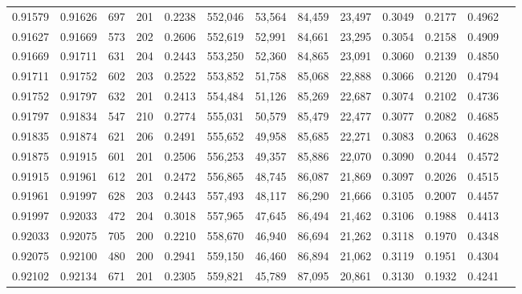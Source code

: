 \begin{tabular}{rrrrrrrrrrrrr}
0.91579 & 0.91626 &   697 & 201 &                                     0.2238 & 552,046 &  53,564 &  84,459 &  23,497 & 0.3049 & 0.2177 & 0.4962 \\
0.91627 & 0.91669 &   573 & 202 &                                     0.2606 & 552,619 &  52,991 &  84,661 &  23,295 & 0.3054 & 0.2158 & 0.4909 \\
0.91669 & 0.91711 &   631 & 204 &                                     0.2443 & 553,250 &  52,360 &  84,865 &  23,091 & 0.3060 & 0.2139 & 0.4850 \\
0.91711 & 0.91752 &   602 & 203 &                                     0.2522 & 553,852 &  51,758 &  85,068 &  22,888 & 0.3066 & 0.2120 & 0.4794 \\
0.91752 & 0.91797 &   632 & 201 &                                     0.2413 & 554,484 &  51,126 &  85,269 &  22,687 & 0.3074 & 0.2102 & 0.4736 \\
0.91797 & 0.91834 &   547 & 210 &                                     0.2774 & 555,031 &  50,579 &  85,479 &  22,477 & 0.3077 & 0.2082 & 0.4685 \\
0.91835 & 0.91874 &   621 & 206 &                                     0.2491 & 555,652 &  49,958 &  85,685 &  22,271 & 0.3083 & 0.2063 & 0.4628 \\
0.91875 & 0.91915 &   601 & 201 &                                     0.2506 & 556,253 &  49,357 &  85,886 &  22,070 & 0.3090 & 0.2044 & 0.4572 \\
0.91915 & 0.91961 &   612 & 201 &                                     0.2472 & 556,865 &  48,745 &  86,087 &  21,869 & 0.3097 & 0.2026 & 0.4515 \\
0.91961 & 0.91997 &   628 & 203 &                                     0.2443 & 557,493 &  48,117 &  86,290 &  21,666 & 0.3105 & 0.2007 & 0.4457 \\
0.91997 & 0.92033 &   472 & 204 &                                     0.3018 & 557,965 &  47,645 &  86,494 &  21,462 & 0.3106 & 0.1988 & 0.4413 \\
0.92033 & 0.92075 &   705 & 200 &                                     0.2210 & 558,670 &  46,940 &  86,694 &  21,262 & 0.3118 & 0.1970 & 0.4348 \\
0.92075 & 0.92100 &   480 & 200 &                                     0.2941 & 559,150 &  46,460 &  86,894 &  21,062 & 0.3119 & 0.1951 & 0.4304 \\
0.92102 & 0.92134 &   671 & 201 &                                     0.2305 & 559,821 &  45,789 &  87,095 &  20,861 & 0.3130 & 0.1932 & 0.4241 \\

\end{tabular}
